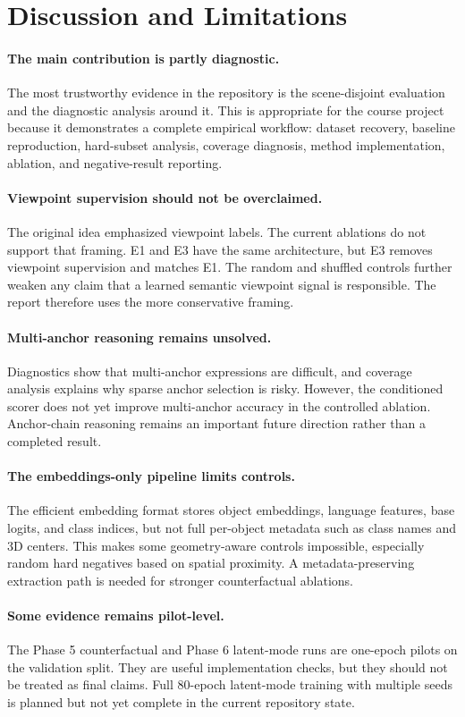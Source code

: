\section{Discussion and Limitations}

\paragraph{The main contribution is partly diagnostic.}
The most trustworthy evidence in the repository is the scene-disjoint evaluation and the diagnostic analysis around it. This is appropriate for the course project because it demonstrates a complete empirical workflow: dataset recovery, baseline reproduction, hard-subset analysis, coverage diagnosis, method implementation, ablation, and negative-result reporting.

\paragraph{Viewpoint supervision should not be overclaimed.}
The original idea emphasized viewpoint labels. The current ablations do not support that framing. E1 and E3 have the same architecture, but E3 removes viewpoint supervision and matches E1. The random and shuffled controls further weaken any claim that a learned semantic viewpoint signal is responsible. The report therefore uses the more conservative \method{} framing.

\paragraph{Multi-anchor reasoning remains unsolved.}
Diagnostics show that multi-anchor expressions are difficult, and coverage analysis explains why sparse anchor selection is risky. However, the conditioned scorer does not yet improve multi-anchor accuracy in the controlled ablation. Anchor-chain reasoning remains an important future direction rather than a completed result.

\paragraph{The embeddings-only pipeline limits controls.}
The efficient embedding format stores object embeddings, language features, base logits, and class indices, but not full per-object metadata such as class names and 3D centers. This makes some geometry-aware controls impossible, especially random hard negatives based on spatial proximity. A metadata-preserving extraction path is needed for stronger counterfactual ablations.

\paragraph{Some evidence remains pilot-level.}
The Phase 5 counterfactual and Phase 6 latent-mode runs are one-epoch pilots on the validation split. They are useful implementation checks, but they should not be treated as final claims. Full 80-epoch latent-mode training with multiple seeds is planned but not yet complete in the current repository state.
